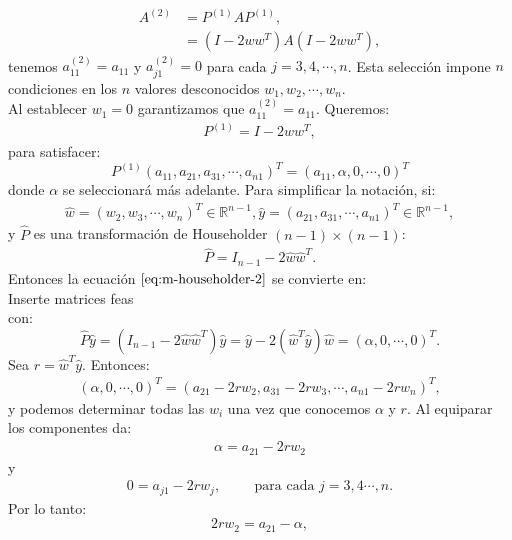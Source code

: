 \begin{align*}
  A^{(2)}&=P^{(1)}AP^{(1)},\\
  &=(I-2ww^T)A(I-2ww^T),
\end{align*}
tenemos $a_{11}^{(2)}=a_{11}$ y $a_{j1}^{(2)}=0$ para cada $j=3,4,\cdots,n$. Esta selección impone $n$ condiciones en los $n$ valores desconocidos $w_1,w_2,\cdots,w_n$.\\
Al establecer $w_1=0$ garantizamos que $a_{11}^{(2)}=a_{11}$. Queremos:
\begin{align*}
  P^{(1)}=I-2ww^T,
\end{align*}
para satisfacer:
\begin{equation}\label{eq:m-householder-2}
  P^{(1)}(a_{11},a_{21},a_{31},\cdots,a_{n1})^{T}=(a_{11},\alpha,0,\cdots,0)^T
\end{equation}
donde $\alpha$ se seleccionará más adelante. Para simplificar la notación, si:
\begin{align*}
  \hat{w}=(w_2,w_3,\cdots,w_n)^{T}\in\mathbb{R}^{n-1}, \hat{y}=(a_{21},a_{31},\cdots,a_{n1})^{T}\in\mathbb{R}^{n-1},  
\end{align*}
y $\hat{P}$ es una transformación de Householder $(n-1)\times(n-1)$:
\begin{align*}
  \hat{P}=I_{n-1}-2\hat{w}\hat{w}^T.
\end{align*}
Entonces la ecuación $\ref{eq:m-householder-2}$ se convierte en:\\
Inserte matrices feas\\ 
con:
\begin{equation}\label{eq:m-householder-9.10}
  \hat{P}\hat{y}=(I_{n-1}-2\hat{w}\hat{w}^T)\hat{y}=\hat{y}-2(\hat{w}^T\hat{y})\hat{w}=(\alpha,0,\cdots,0)^T.
\end{equation}
Sea $r=\hat{w}^T\hat{y}$. Entonces:
\begin{align*}
  (\alpha,0,\cdots,0)^{T}=(a_{21}-2rw_2,a_{31}-2rw_3,\cdots,a_{n1}-2rw_n)^T,
\end{align*}
y podemos determinar todas las $w_i$ una vez que conocemos $\alpha$ y $r$. Al equiparar los componentes da:
\begin{align*}
  \alpha=a_{21}-2rw_2
\end{align*}
y
\begin{align*}
  0=a_{j1}-2rw_j, \hspace{1cm}\text{para cada }j=3,4\cdots,n.
\end{align*}
Por lo tanto:
\begin{equation}\label{eq:m-householder-9.11}
  2rw_2=a_{21}-\alpha,
\end{equation}
